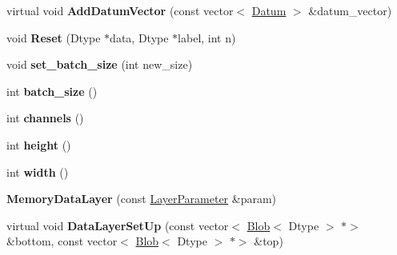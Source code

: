 \begin{DoxyCompactItemize}
virtual void {\bfseries Add\+Datum\+Vector} (const vector$<$ \mbox{\hyperlink{classcaffe_1_1_datum}{Datum}} $>$ \&datum\+\_\+vector)
\item 
\mbox{\label{classcaffe_1_1_memory_data_layer_aeaa745c4fe3a957b973bf94dca6a5f2b}} 
void {\bfseries Reset} (Dtype $\ast$data, Dtype $\ast$label, int n)
\item 
\mbox{\label{classcaffe_1_1_memory_data_layer_a07bc96b979032d11a0bf00fad6a3f1ff}} 
void {\bfseries set\+\_\+batch\+\_\+size} (int new\+\_\+size)
\item 
\mbox{\label{classcaffe_1_1_memory_data_layer_a06bfb6d06f61db11699a6b3ce7b1ee53}} 
int {\bfseries batch\+\_\+size} ()
\item 
\mbox{\label{classcaffe_1_1_memory_data_layer_aeeed090aee729e61426525c6a62f79a2}} 
int {\bfseries channels} ()
\item 
\mbox{\label{classcaffe_1_1_memory_data_layer_a13775655bc0563ec85f124604ebb945f}} 
int {\bfseries height} ()
\item 
\mbox{\label{classcaffe_1_1_memory_data_layer_a2c8b2f60895130d3ebfdc775724b5503}} 
int {\bfseries width} ()
\item 
\mbox{\label{classcaffe_1_1_memory_data_layer_a9bf012786068bfe846694af129a6736f}} 
{\bfseries Memory\+Data\+Layer} (const \mbox{\hyperlink{classcaffe_1_1_layer_parameter}{Layer\+Parameter}} \&param)
\item 
\mbox{\label{classcaffe_1_1_memory_data_layer_a3ee96cf337f51bb9a62e7721fd2b54da}} 
virtual void {\bfseries Data\+Layer\+Set\+Up} (const vector$<$ \mbox{\hyperlink{classcaffe_1_1_blob}{Blob}}$<$ Dtype $>$ $\ast$$>$ \&bottom, const vector$<$ \mbox{\hyperlink{classcaffe_1_1_blob}{Blob}}$<$ Dtype $>$ $\ast$$>$ \&top)
\item 
\mbox{\label{classcaffe_1_1_memory_data_layer_a374835f9df814ef78e3f4a4d640f0d35}} 

\end{DoxyCompactItemize}
